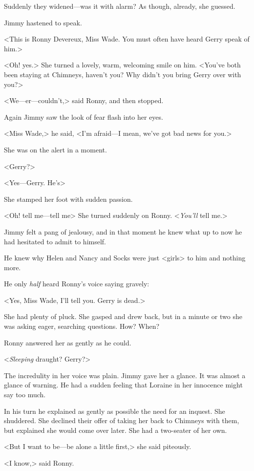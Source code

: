 Suddenly they widened—was it with alarm? As though, already, she guessed.

Jimmy hastened to speak.

<This is Ronny Devereux, Miss Wade. You must often have heard Gerry speak of him.>

<Oh! yes.> She turned a lovely, warm, welcoming smile on him. <You've both been staying at Chimneys, haven't you? Why didn't you bring Gerry over with you?>

<We—er—couldn't,> said Ronny, and then stopped.

Again Jimmy saw the look of fear flash into her eyes.

<Miss Wade,> he said, <I'm afraid—I mean, we've got bad news for you.>

She was on the alert in a moment.

<Gerry?>

<Yes—Gerry. He's\longdash>

She stamped her foot with sudden passion.

<Oh! tell me—tell me\longdash> She turned suddenly on Ronny. <\emph{You'll} tell me.>

Jimmy felt a pang of jealousy, and in that moment he knew what up to now he had hesitated to admit to himself.

He knew why Helen and Nancy and Socks were just <girls> to him and nothing more.

He only \emph{half} heard Ronny's voice saying gravely:

<Yes, Miss Wade, I'll tell you. Gerry is dead.>

She had plenty of pluck. She gasped and drew back, but in a minute or two she was asking eager, searching questions. How? When?

Ronny answered her as gently as he could.

<\emph{Sleeping} draught? Gerry?>

The incredulity in her voice was plain. Jimmy gave her a glance. It was almost a glance of warning. He had a sudden feeling that Loraine in her innocence might say too much.

In his turn he explained as gently as possible the need for an inquest. She shuddered. She declined their offer of taking her back to Chimneys with them, but explained she would come over later. She had a two-seater of her own.

<But I want to be—be alone a little first,> she said piteously.

<I know,> said Ronny.

